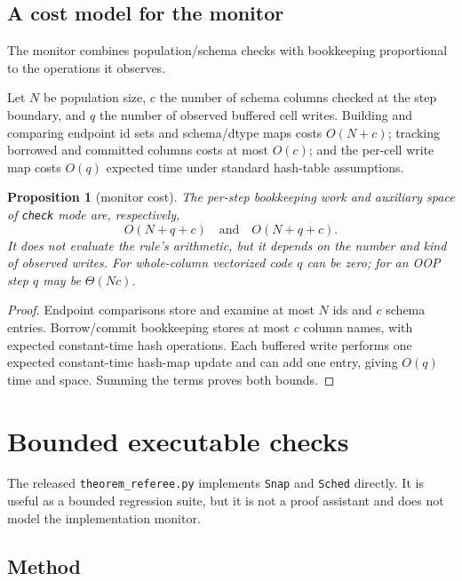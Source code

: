 \documentclass[sigconf,nonacm,review,natbib=true]{acmart}
\newtheorem{proposition}{Proposition}
\theoremstyle{definition}
\theoremstyle{plain}
\theoremstyle{remark}
\begin{document}
\subsection{A cost model for the monitor}\label{ax:cost}

The monitor combines population/schema checks with bookkeeping proportional to
the operations it observes.

Let $N$ be population size, $c$ the number of schema columns checked at the
step boundary, and $q$ the number of observed buffered cell writes. Building
and comparing endpoint id sets and schema/dtype maps costs $O(N+c)$; tracking
borrowed and committed columns costs at most $O(c)$; and the per-cell write map
costs $O(q)$ expected time under standard hash-table assumptions.

\begin{proposition}[monitor cost]\label{prop:cost}
The per-step bookkeeping work and auxiliary space of
\textnormal{\texttt{check}} mode are, respectively,
\[
O(N+q+c)\quad\text{and}\quad O(N+q+c).
\]
It does not evaluate the rule's arithmetic, but it depends on the number and
kind of observed writes. For whole-column vectorized code $q$ can be zero; for
an OOP step $q$ may be $\Theta(Nc)$.

\end{proposition}

\begin{proof} Endpoint comparisons store and examine at most $N$ ids and $c$
schema entries. Borrow/commit bookkeeping stores at most $c$ column names, with
expected constant-time hash operations. Each buffered write performs one
expected constant-time hash-map update and can add one entry, giving $O(q)$
time and space. Summing the terms proves both bounds.\end{proof}


\section{Bounded executable checks}
\label{app:referee}

The released \texttt{theorem\_referee.py} implements \texttt{Snap} and
\texttt{Sched} directly. It is useful as a bounded regression suite, but it is
not a proof assistant and does not model the implementation monitor.

\subsection{Method}\label{ax:ref:method}
\end{document}
